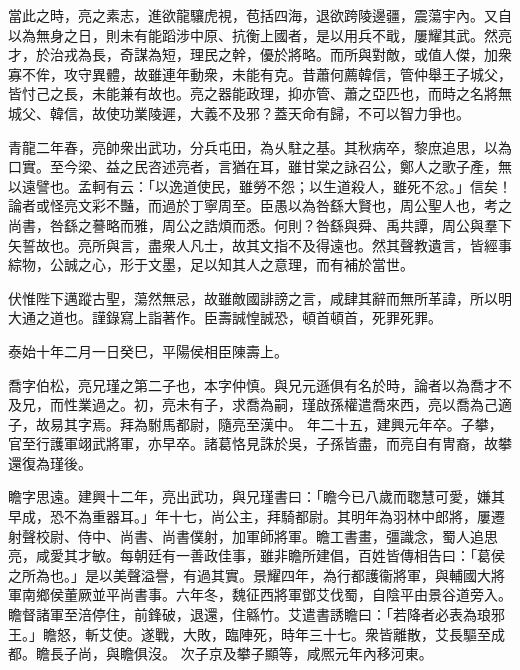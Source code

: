 \begin{pinyinscope}
 
 
 
 當此之時，亮之素志，進欲龍驤虎視，苞括四海，退欲跨陵邊疆，震蕩宇內。又自以為無身之日，則未有能蹈涉中原、抗衡上國者，是以用兵不戢，屢耀其武。然亮才，於治戎為長，奇謀為短，理民之幹，優於將略。而所與對敵，或值人傑，加衆寡不侔，攻守異體，故雖連年動衆，未能有克。昔蕭何薦韓信，管仲舉王子城父，皆忖己之長，未能兼有故也。亮之器能政理，抑亦管、蕭之亞匹也，而時之名將無城父、韓信，故使功業陵遲，大義不及邪？蓋天命有歸，不可以智力爭也。
 
 
 
 
 青龍二年春，亮帥衆出武功，分兵屯田，為乆駐之基。其秋病卒，黎庶追思，以為口實。至今梁、益之民咨述亮者，言猶在耳，雖甘棠之詠召公，鄭人之歌子產，無以遠譬也。孟軻有云：「以逸道使民，雖勞不怨；以生道殺人，雖死不忿。」信矣！論者或怪亮文彩不豔，而過於丁寧周至。臣愚以為咎繇大賢也，周公聖人也，考之尚書，咎繇之謩略而雅，周公之誥煩而悉。何則？咎繇與舜、禹共譚，周公與羣下矢誓故也。亮所與言，盡衆人凡士，故其文指不及得遠也。然其聲教遺言，皆經事綜物，公誠之心，形于文墨，足以知其人之意理，而有補於當世。
 
 
 
 
 伏惟陛下邁蹤古聖，蕩然無忌，故雖敵國誹謗之言，咸肆其辭而無所革諱，所以明大通之道也。謹錄寫上詣著作。臣壽誠惶誠恐，頓首頓首，死罪死罪。
 
 
 
 
 泰始十年二月一日癸巳，平陽侯相臣陳壽上。
 
 
喬字伯松，亮兄瑾之第二子也，本字仲慎。與兄元遜俱有名於時，論者以為喬才不及兄，而性業過之。初，亮未有子，求喬為嗣，瑾啟孫權遣喬來西，亮以喬為己適子，故易其字焉。拜為駙馬都尉，隨亮至漢中。
 年二十五，建興元年卒。子攀，官至行護軍翊武將軍，亦早卒。諸葛恪見誅於吳，子孫皆盡，而亮自有冑裔，故攀還復為瑾後。
 
 
瞻字思遠。建興十二年，亮出武功，與兄瑾書曰：「瞻今已八歲而聦慧可愛，嫌其早成，恐不為重器耳。」年十七，尚公主，拜騎都尉。其明年為羽林中郎將，屢遷射聲校尉、侍中、尚書、尚書僕射，加軍師將軍。瞻工書畫，彊識念，蜀人追思亮，咸愛其才敏。每朝廷有一善政佳事，雖非瞻所建倡，百姓皆傳相告曰：「葛侯之所為也。」是以美聲溢譽，有過其實。景耀四年，為行都護衞將軍，與輔國大將軍南鄉侯董厥並平尚書事。六年冬，魏征西將軍鄧艾伐蜀，自陰平由景谷道旁入。瞻督諸軍至涪停住，前鋒破，退還，住緜竹。艾遣書誘瞻曰：「若降者必表為琅邪王。」瞻怒，斬艾使。遂戰，大敗，臨陣死，時年三十七。衆皆離散，艾長驅至成都。瞻長子尚，與瞻俱沒。
 次子京及攀子顯等，咸熈元年內移河東。
 

\end{pinyinscope}
